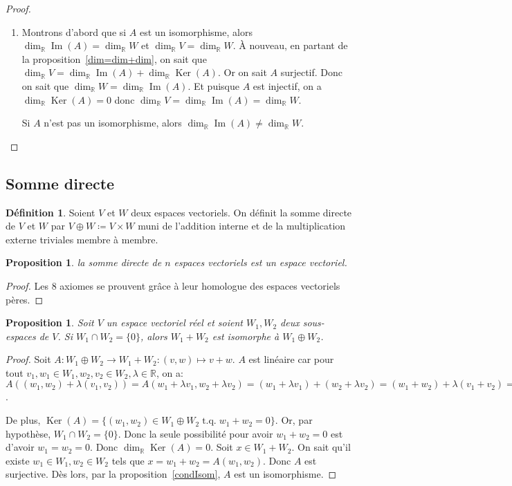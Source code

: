 \documentclass{article}
\DeclareMathOperator{\tq}{\text{ t.q. }}
\DeclareMathOperator{\Ker}{Ker}
\DeclareMathOperator{\Imf}{Im}
\newcommand{\R}{\mathbb R}
\newtheorem{prp}[thm]{Proposition}
\theoremstyle{definition}
\newtheorem{déf}[thm]{Définition}
\theoremstyle{remark}
\begin{document}
\begin{proof}
\begin{enumerate}
			\item Montrons d'abord que si $A$ est un isomorphisme, alors $\dim_\R \Imf(A) = \dim_\R W$ et $\dim_\R V = \dim_\R W$. À nouveau, en partant de la
			proposition~\ref{dim=dim+dim}, on sait que $\dim_\R V = \dim_\R \Imf(A) + \dim_\R\Ker(A)$. Or on sait $A$ surjectif. Donc on sait que $\dim_\R W = \dim_\R\Imf(A)$.
			Et puisque $A$ est injectif, on a $\dim_\R\Ker(A) = 0$ donc $\dim_\R V = \dim_\R\Imf(A) = \dim_\R W$.

			Si $A$ n'est pas un isomorphisme, alors $\dim_\R\Imf(A) \neq \dim_\R W$.
		\end{enumerate}
		\end{proof}
	
	\subsection{Somme directe}
		\begin{déf} Soient $V$ et $W$ deux espaces vectoriels. On définit la somme directe de $V$ et $W$ par $V \oplus W \coloneqq V \times W$ muni de l'addition interne et
		de la multiplication externe triviales membre à membre. \end{déf}

		\begin{prp} la somme directe de $n$ espaces vectoriels est un espace vectoriel. \end{prp}

		\begin{proof} Les 8 axiomes se prouvent grâce à leur homologue des espaces vectoriels pères. \end{proof}

		\begin{prp} Soit $V$ un espace vectoriel réel et soient $W_1, W_2$ deux sous-espaces de $V$. Si $W_1 \cap W_2 = \{0\}$, alors $W_1+W_2$ est isomorphe à
		$W_1 \oplus W_2$. \end{prp}

		\begin{proof} Soit $A : W_1 \oplus W_2 \to W_1 + W_2 : (v,w) \mapsto v+w$. $A$ est linéaire car pour tout $v_1, w_1 \in W_1, w_2, v_2 \in W_2, \lambda \in \R$, on a:
		$A((w_1, w_2) + \lambda(v_1, v_2)) = A(w_1 + \lambda v_1, w_2 + \lambda v_2) = (w_1+\lambda v_1) + (w_2 + \lambda v_2) = (w_1 + w_2) + \lambda(v_1+v_2)
		= A(w_1, w_2) + \lambda A(v_1, v_2)$.
		
		De plus, $\Ker(A) = \{(w_1, w_2) \in W_1 \oplus W_2 \tq w_1 + w_2 = 0\}$. Or, par hypothèse, $W_1 \cap W_2 = \{0\}$. Donc la seule possibilité pour avoir $w_1+w_2=0$
		est d'avoir $w_1=w_2=0$. Donc $\dim_\R\Ker(A) = 0$. Soit $x \in W_1+W_2$. On sait qu'il existe $w_1 \in W_1, w_2 \in W_2$ tels que $x = w_1+w_2 = A(w_1, w_2)$. Donc
		$A$ est surjective. Dès lors, par la proposition~\ref{condIsom}, $A$ est un isomorphisme. \end{proof}
\end{document}
